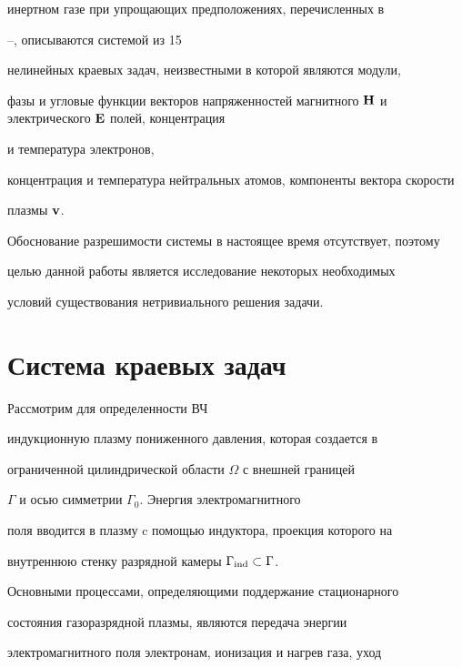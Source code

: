 инертном газе при упрощающих предположениях, перечисленных в


\cite{my_book}--\cite{my_pap2}, описываются системой из 15


нелинейных краевых задач, неизвестными в которой являются модули,


фазы и угловые функции векторов напряженностей магнитного $\bold


H$ и электрического $\bold E$ полей, концентрация


и температура электронов,


концентрация и температура нейтральных атомов, компоненты вектора скорости 


плазмы $\bold v$.








Обоснование разрешимости системы в настоящее время отсутствует, поэтому


целью данной работы является исследование некоторых необходимых


условий существования нетривиального решения задачи.








\section{Система краевых задач}





Рассмотрим для определенности ВЧ


индукционную плазму пониженного давления, которая создается в


ограниченной цилиндрической области $\Omega$ с внешней границей


$\Gamma$ и осью симметрии $\Gamma_0$. Энергия электромагнитного


поля вводится в плазму c помощью индуктора, проекция которого на


внутреннюю стенку разрядной камеры $\Gamma_{\operatorname{ind}} \subset \Gamma$.





Основными процессами, определяющими поддержание стационарного


состояния газоразрядной плазмы, являются передача энергии


электромагнитного поля электронам, ионизация и нагрев газа, уход


